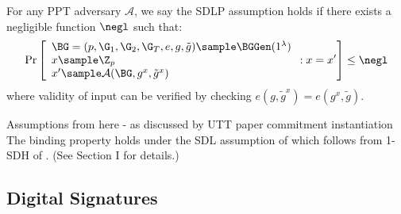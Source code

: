 \begin{definition}\label{sdlp}
For any PPT adversary $\mathcal{A}$, we say the SDLP assumption holds if there exists a negligible function $\negl$ such that:
$$\Pr\left[\begin{array}{l}
    \BG = (p, \G_1, \G_2, \G_T, e, g, \tilde{g}) \sample \BGGen(1^\lambda) \\
    x \sample \Z_p \\
    x' \sample \mathcal{A}(\BG, g^x, \tilde{g}^x)
\end{array} : x = x'\right] \leq \negl$$
where validity of input can be verified by checking $e(g, \tilde{g}^x) = e(g^x, \tilde{g})$.
\end{definition}



Assumptions from here - as discussed by UTT paper commitment instantiation
The binding property holds under the SDL assumption of \cite{hutchison_get_2010}
which follows from 1-SDH of \cite{boneh_short_2008}. (See Section I for details.) 






\subsection{Digital Signatures}

